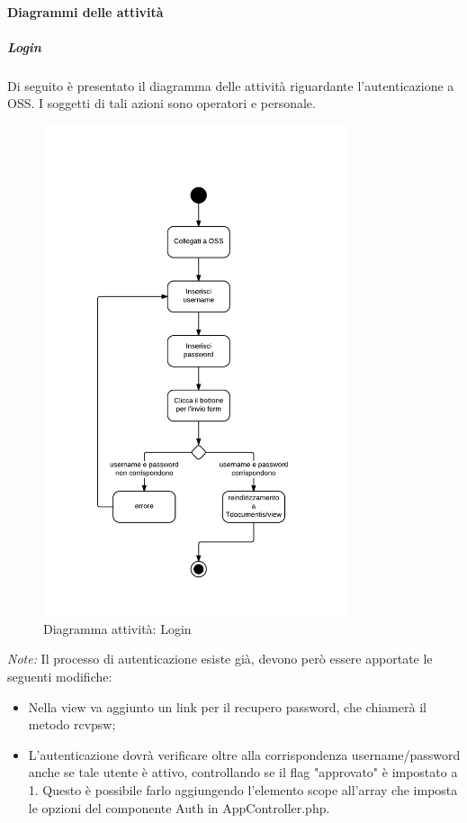 \paragraph{Diagrammi delle attività}


\subparagraph{Login}
Di seguito è presentato il diagramma delle attività riguardante l'autenticazione a OSS. I soggetti di tali azioni sono operatori e personale.\\

\begin{figure}[H]
\centering
\includegraphics[width=0.8\textwidth]{images/user_login.png}
\caption{Diagramma attività: Login}
\end{figure}

\textit{Note:}
Il processo di autenticazione esiste già, devono però essere apportate le seguenti modifiche:
\begin{itemize}
\item Nella view va aggiunto un link per il recupero password, che chiamerà il metodo rcvpsw;
\item L'autenticazione dovrà verificare oltre alla corrispondenza username/password anche se tale utente è attivo, controllando se il flag "approvato" è impostato a 1. Questo è possibile farlo aggiungendo l'elemento scope all'array che imposta le opzioni del componente Auth in AppController.php.
\end{itemize}


